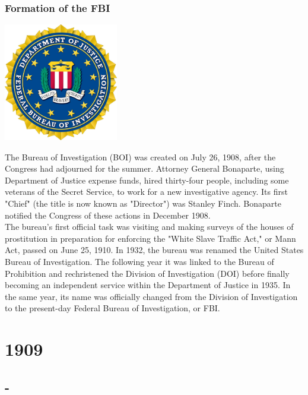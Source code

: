 \documentclass[11pt]{report}
\begin{document}
\subsection{Formation of the FBI}
\vspace{2mm}\begin{center}\includegraphics[width=5cm]{./img/FBILogo.jpg}\end{center}
The Bureau of Investigation (BOI) was created on July 26, 1908, after the Congress had adjourned for the summer. Attorney General Bonaparte, using Department of Justice expense funds, hired thirty-four people, including some veterans of the Secret Service, to work for a new investigative agency. Its first "Chief" (the title is now known as "Director") was Stanley Finch. Bonaparte notified the Congress of these actions in December 1908.\\
The bureau's first official task was visiting and making surveys of the houses of prostitution in preparation for enforcing the "White Slave Traffic Act," or Mann Act, passed on June 25, 1910. In 1932, the bureau was renamed the United States Bureau of Investigation. The following year it was linked to the Bureau of Prohibition and rechristened the Division of Investigation (DOI) before finally becoming an independent service within the Department of Justice in 1935. In the same year, its name was officially changed from the Division of Investigation to the present-day Federal Bureau of Investigation, or FBI.

\chapter{1909}
\section{-}
\end{document}
